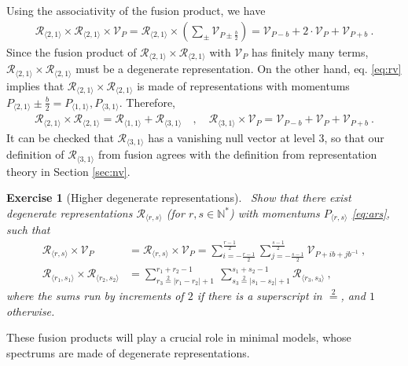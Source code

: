\documentclass[12pt, a4paper]{article}
\theoremstyle{break}
\newtheorem{exo}{Exercise}[section]
\begin{document}
Using the associativity of the fusion product, we have 
\begin{align}
 \mathcal{R}_{\langle 2,1\rangle}\times \mathcal{R}_{\langle 2,1\rangle}  \times \mathcal V_P  =
\mathcal{R}_{\langle 2,1\rangle}\times  \left(\sum_\pm \mathcal V_{P\pm \frac{b}{2}}\right) =
\mathcal V_{P - b} + 2\cdot \mathcal V_P + \mathcal V_{P + b} \ .
\end{align}
Since the fusion product of $\mathcal{R}_{\langle 2,1\rangle}\times \mathcal{R}_{\langle 2,1\rangle} $ with $\mathcal V_P$ has finitely many terms, $\mathcal{R}_{\langle 2,1\rangle}\times \mathcal{R}_{\langle 2,1\rangle} $
must be a degenerate representation. 
On the other hand, eq. \eqref{eq:rv} implies that $\mathcal{R}_{\langle 2,1\rangle}\times \mathcal{R}_{\langle 2,1\rangle} $ is made of representations with momentums $P_{\langle 2,1\rangle} \pm \frac{b}{2} = P_{\langle 1,1\rangle}, P_{\langle 3,1\rangle}$. Therefore,
\begin{align}
 \mathcal{R}_{\langle 2,1\rangle}\times \mathcal{R}_{\langle 2,1\rangle} = \mathcal{R}_{\langle 1,1\rangle} + \mathcal{R}_{\langle 3,1\rangle} \quad , \quad \mathcal{R}_{\langle 3,1\rangle} \times \mathcal V_P = \mathcal V_{P - b} + \mathcal V_P + \mathcal V_{P + b}\ .
\end{align}
It can be checked that $\mathcal{R}_{\langle 3,1\rangle}$ has a vanishing null vector at level $3$, so that our definition of $\mathcal{R}_{\langle 3,1\rangle}$ from fusion agrees with the definition from representation theory in Section \ref{sec:nv}.

\begin{exo}[Higher degenerate representations]
~\label{exo:hdr}
 Show that there exist degenerate representations $\mathcal{R}_{\langle r,s \rangle}$ (for $r, s \in \mathbb{N}^*$) with momentums $P_{\langle r,s \rangle}$ \eqref{eq:ars},
such that 
 \begin{align}
 \mathcal{R}_{\langle r,s \rangle}\times \mathcal{V}_P &= \mathcal{R}_{\langle r,s \rangle}\times \mathcal{V}_P = \sum_{i=-\frac{r-1}{2}}^{\frac{r-1}{2}} \sum_{j=-\frac{s-1}{2}}^{\frac{s-1}{2}} \mathcal{V}_{P + ib+jb^{-1}}\ ,
\label{rtv}
 \\
 \mathcal{R}_{\langle r_1,s_1 \rangle} \times \mathcal{R}_{\langle r_2,s_2 \rangle} &= \sum_{r_3\overset{2}{=}|r_1-r_2|+1}^{r_1+r_2-1}\ \sum_{s_3\overset{2}{=}|s_1-s_2|+1}^{s_1+s_2-1} \mathcal{R}_{\langle r_3,s_3 \rangle}\ ,
\label{rrsr}
\end{align}
where the sums run by increments of $2$ if there is a superscript in $\overset{2}{=}$, and $1$ otherwise.
\end{exo}
These fusion products will play a crucial role in minimal models, whose spectrums are made of degenerate representations. 
\end{document}
